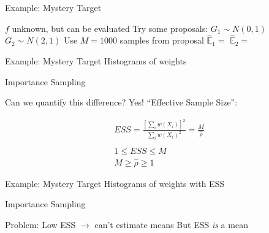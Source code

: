 \documentclass[14pt]{beamer}
\newcommand{\bE}{\mathbb{E}}
\begin{document}
\begin{frame}{Example: Mystery Target}
    \begin{outline}
        \1 $f$ unknown, but can be evaluated \newline
        \1 Try some proposals:
            \2 $G_1 \sim N(0,1)$
            \2 $G_2 \sim N(2,1)$ \newline
        \1 Use $M=1000$ samples from proposal
            \2 $\hat{\bE}_1 = $
            \2 $\hat{\bE}_2 = $
    \end{outline}    
\end{frame}

\begin{frame}{Example: Mystery Target}
    Histograms of weights
\end{frame}

\begin{frame}{Importance Sampling}
    \begin{outline}
        \1 Can we quantify this difference?
            \2 Yes!
        \1 ``Effective Sample Size'':
    \end{outline}
    \begin{gather*}
        ESS = \frac{\left[\sum_i w(X_i)\right]^2}{\sum_i w(X_i)^2} = \frac{M}{\hat{\rho}}\\ \\
        1 \leq ESS \leq M\\
        M \geq \hat{\rho} \geq 1
    \end{gather*}
\end{frame}

\begin{frame}{Example: Mystery Target}
    Histograms of weights with ESS
\end{frame}

\begin{frame}{Importance Sampling}
    \begin{outline}
        \1 Problem: Low ESS $\rightarrow$ can't estimate means \newline
        \1 But ESS \textit{is} a mean
            \2 \citep{Cha18}
    \end{outline}
\end{frame}

\end{document}
